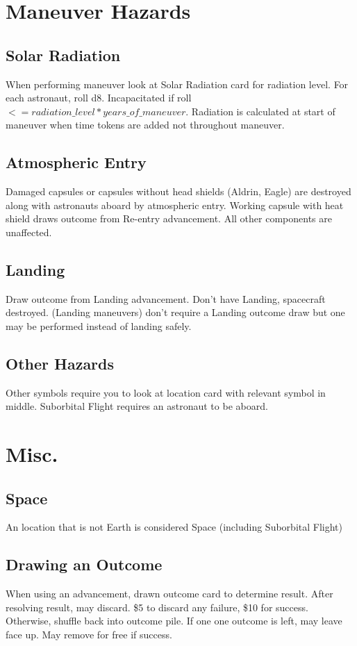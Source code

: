\documentclass[12pt]{article}
\begin{document}
\begin{multicols*}{2}
\section*{Maneuver Hazards}
\subsection*{Solar Radiation}
When performing maneuver look at Solar Radiation card for radiation level. For each astronaut, roll d8. Incapacitated if roll $<= radiation\_level * years\_of\_maneuver$. Radiation is calculated at start of maneuver when time tokens are added not throughout maneuver.

\subsection*{Atmospheric Entry}
Damaged capsules or capsules without head shields (Aldrin, Eagle) are destroyed along with astronauts aboard by atmospheric entry. Working capsule with heat shield draws outcome from Re-entry advancement. All other components are unaffected.

\subsection*{Landing}
Draw outcome from Landing advancement. Don't have Landing, spacecraft destroyed. (Landing maneuvers) don't require a Landing outcome draw but one may be performed instead of landing safely.

\subsection*{Other Hazards}
Other symbols require you to look at location card with relevant symbol in middle. Suborbital Flight requires an astronaut to be aboard.

\section*{Misc.}
\subsection*{Space}
    An location that is not Earth is considered Space (including Suborbital Flight)

\subsection*{Drawing an Outcome}
When using an advancement, drawn outcome card to determine result. After resolving result, may discard. \$5 to discard any failure, \$10 for success. Otherwise, shuffle back into outcome pile. If one one outcome is left, may leave face up. May remove for free if success.


\end{multicols*}
\end{document}
